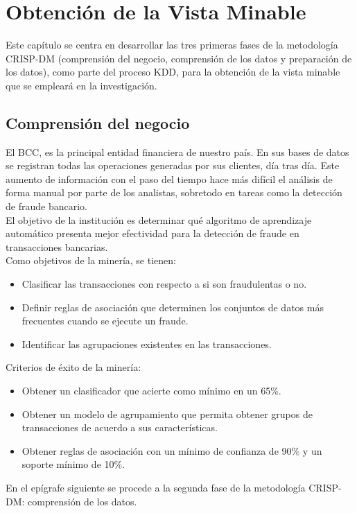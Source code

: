 \chapter{Obtención de la Vista Minable}\label{chap:2}

Este capítulo se centra en desarrollar las tres primeras fases de la metodología CRISP-DM (comprensión del negocio, comprensión de los datos y preparación de los datos), como parte del proceso KDD, para la obtención de la vista minable que se empleará en la investigación. 


\section{Comprensión del negocio}

El BCC, es la principal entidad financiera de nuestro país. En sus bases de datos se registran todas las operaciones generadas por sus clientes, día tras día. Este aumento de información con el paso del tiempo hace más difícil el análisis de forma manual por parte de los analistas, sobretodo en tareas como la detección de fraude bancario. \\
El objetivo de la institución es determinar qué algoritmo de aprendizaje automático presenta mejor efectividad para la detección de fraude en transacciones bancarias. \\
Como objetivos de la minería, se tienen:
\begin{itemize}
	\item Clasificar las transacciones con respecto a si son fraudulentas o no.
	\item Definir reglas de asociación que determinen los conjuntos de datos más frecuentes cuando se ejecute un fraude. 
	\item Identificar las agrupaciones existentes en las transacciones.
\end{itemize}
Criterios de éxito de la minería:
\begin{itemize}
	\item Obtener un clasificador que acierte como mínimo en un 65\%.
	\item Obtener un modelo de agrupamiento que permita obtener grupos de transacciones de acuerdo a sus características.
	\item Obtener reglas de asociación con un mínimo de confianza de 90\% y un soporte mínimo de 10\%.	
\end{itemize}
En el epígrafe siguiente se procede a la segunda fase de la metodología CRISP-DM: comprensión de los datos.

